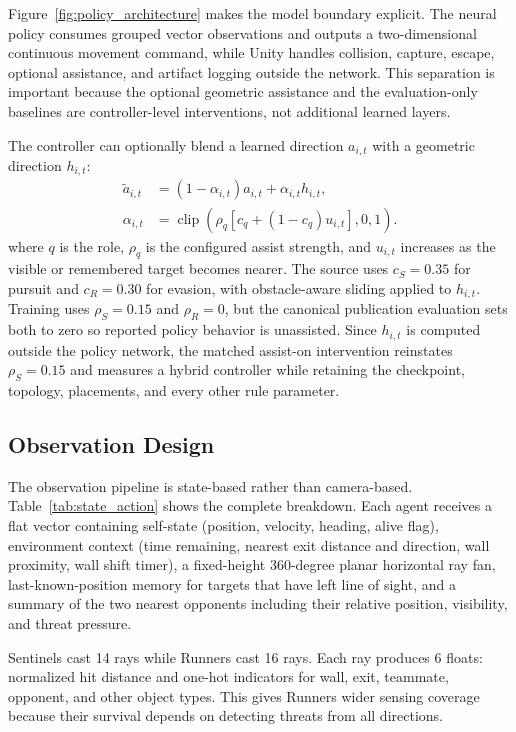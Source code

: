 \documentclass[journal]{IEEEtran}
\begin{document}
Figure~\ref{fig:policy_architecture} makes the model boundary explicit. The neural policy consumes grouped vector observations and outputs a two-dimensional continuous movement command, while Unity handles collision, capture, escape, optional assistance, and artifact logging outside the network. This separation is important because the optional geometric assistance and the evaluation-only baselines are controller-level interventions, not additional learned layers.

The controller can optionally blend a learned direction $a_{i,t}$ with a geometric direction $h_{i,t}$:
\begin{align}
\widetilde{a}_{i,t}&=(1-\alpha_{i,t})a_{i,t}+\alpha_{i,t}h_{i,t},\\
\alpha_{i,t}&=\operatorname{clip}\!\left(\rho_q[c_q+(1-c_q)u_{i,t}],0,1\right).
\end{align}
where $q$ is the role, $\rho_q$ is the configured assist strength, and $u_{i,t}$ increases as the visible or remembered target becomes nearer. The source uses $c_S=0.35$ for pursuit and $c_R=0.30$ for evasion, with obstacle-aware sliding applied to $h_{i,t}$. Training uses $\rho_S=0.15$ and $\rho_R=0$, but the canonical publication evaluation sets both to zero so reported policy behavior is unassisted. Since $h_{i,t}$ is computed outside the policy network, the matched assist-on intervention reinstates $\rho_S=0.15$ and measures a hybrid controller while retaining the checkpoint, topology, placements, and every other rule parameter.

\subsection{Observation Design}

The observation pipeline is state-based rather than camera-based. Table~\ref{tab:state_action} shows the complete breakdown. Each agent receives a flat vector containing self-state (position, velocity, heading, alive flag), environment context (time remaining, nearest exit distance and direction, wall proximity, wall shift timer), a fixed-height 360-degree planar horizontal ray fan, last-known-position memory for targets that have left line of sight, and a summary of the two nearest opponents including their relative position, visibility, and threat pressure.

Sentinels cast 14 rays while Runners cast 16 rays. Each ray produces 6 floats: normalized hit distance and one-hot indicators for wall, exit, teammate, opponent, and other object types. This gives Runners wider sensing coverage because their survival depends on detecting threats from all directions.
\end{document}
